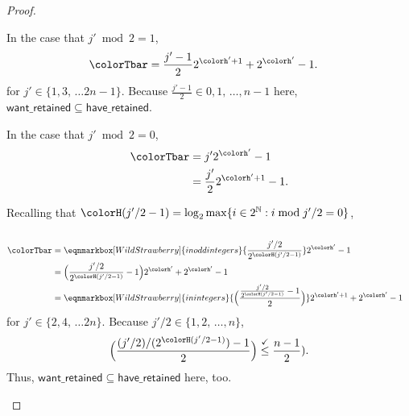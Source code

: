 \begin{proof}
\begin{proofpart}
In the case that $j' \bmod 2 = 1$,
\begin{align*}
\colorTbar
&= \frac{j'-1}{2} 2^{\colorh' + 1} + 2^{\colorh'} - 1.
\end{align*}
for $j' \in \{1, 3, \,\ldots 2n-1\}$.
Because $\frac{j'-1}{2} \in 0, 1, \, \ldots, n - 1$ here, $\mathsf{want\_retained} \subseteq \mathsf{have\_retained}$.

In the case that $j' \bmod 2 = 0$,
\begin{align*}
\colorTbar
&= j'2^{\colorh'} - 1\\
&= \frac{j'}{2}2^{\colorh' + 1} - 1.
\end{align*}

Recalling that $\colorH(j'/2 - 1) = \log_2 \max\{ i \in 2^{\mathbb{N}} : i \bmod j'/2 = 0 \}$,
\begin{align*}
\\
\colorTbar
&=
\eqnmarkbox[WildStrawberry]{inoddintegers}{
  \frac{j'/2}{2^{\colorH(j'/2 - 1)}}
}
2^{\colorh'} - 1\\
&= \Big(\frac{j'/2}{2^{\colorH(j'/2 - 1)}} - 1\Big) 2^{\colorh'} + 2^{\colorh'} - 1\\
&=
\eqnmarkbox[WildStrawberry]{inintegers}{\Big(
  \frac{
    \frac{j'/2}{2^{\colorH(j'/2 - 1)}} - 1
  }{2}
\Big)}
2^{\colorh' + 1} + 2^{\colorh'} - 1
\\
\end{align*}
for $j' \in \{2, 4, \,\ldots 2n\}$.
Because $j'/2 \in \{1, 2, \, \ldots, n\}$,
\begin{align*}
\Big(\frac{(j'/2)/(2^{\colorH(j'/2 - 1)}) - 1}{2}\Big)
\stackrel{\checkmark}{\leq} \frac{n - 1}{2}).
\end{align*}
Thus, $\mathsf{want\_retained} \subseteq \mathsf{have\_retained}$ here, too.
\end{proofpart}
\end{proof}
